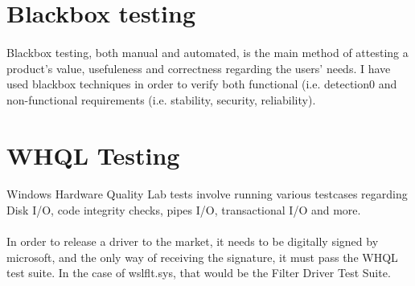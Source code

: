     \section{Blackbox testing}
        \paragraph{}
        Blackbox testing, both manual and automated, is the main method of attesting a product's value, usefuleness and correctness regarding
        the users' needs. I have used blackbox techniques in order to verify both functional (i.e. detection0 and non-functional requirements
        (i.e. stability, security, reliability).

    \section{WHQL Testing}
        \paragraph{}
        Windows Hardware Quality Lab\cite{whql} tests involve running various testcases regarding Disk I/O, code integrity checks, pipes I/O, transactional
        I/O and more.
        
        \paragraph{}
        In order to release a driver to the market, it needs to be digitally signed by microsoft, and the only way of receiving the signature, it
        must pass the WHQL test suite. In the case of wslflt.sys, that would be the Filter Driver Test Suite\cite{fdts}.